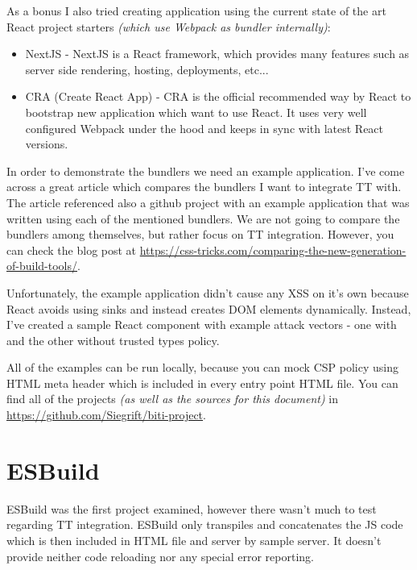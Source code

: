 As a bonus I also tried creating application using the current state of the art React project
starters \emph{(which use Webpack as bundler internally)}:

\begin{itemize}
  \item  NextJS \cite{nextjs_web} - NextJS is a React framework, which provides many features such
        as server side rendering, hosting, deployments, etc...
  \item  CRA (Create React App) \cite{cra_web} - CRA is the official recommended way by React to
        bootstrap new application which want to use React. It uses very well configured Webpack
        under the hood and keeps in sync with latest React versions.
\end{itemize}

\bigskip

In order to demonstrate the bundlers we need an example application. I've come across a great
article which compares the bundlers I want to integrate TT with. The article referenced also a
github project with an example application that was written using each of the mentioned bundlers. We
are not going to compare the bundlers among themselves, but rather focus on TT integration. However,
you can check the blog post at
\url{https://css-tricks.com/comparing-the-new-generation-of-build-tools/}.

Unfortunately, the example application didn't cause any XSS on it's own because React avoids using
sinks and instead creates DOM elements dynamically. Instead, I've created a sample React component
with example attack vectors - one with and the other without trusted types policy.

All of the examples can be run locally, because you can mock CSP policy using HTML meta header which
is included in every entry point HTML file. You can find all of the projects \emph{(as well as the
  sources for this document)} in \url{https://github.com/Siegrift/biti-project}.

\section{ESBuild}

ESBuild was the first project examined, however there wasn't much to test regarding TT integration.
ESBuild only transpiles and concatenates the JS code which is then included in HTML file and server
by sample server. It doesn't provide neither code reloading nor any special error reporting.

